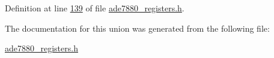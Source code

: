 Definition at line \hyperlink{a00036_source_l00139}{139} of file \hyperlink{a00036_source}{ade7880\-\_\-registers.\-h}.



The documentation for this union was generated from the following file\-:\begin{DoxyCompactItemize}
\item 
\hyperlink{a00036}{ade7880\-\_\-registers.\-h}\end{DoxyCompactItemize}
